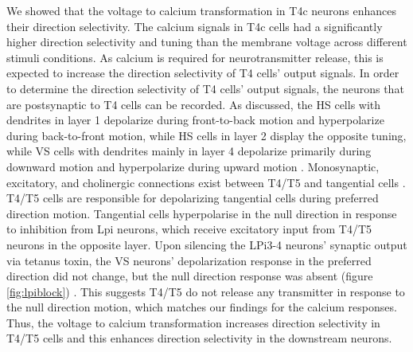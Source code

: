 We showed that the voltage to calcium transformation in T4c neurons enhances their direction selectivity. The calcium signals in T4c cells had a significantly higher direction selectivity and tuning than the membrane voltage across different stimuli conditions. As calcium is required for neurotransmitter release, this is expected to increase the direction selectivity of T4 cells' output signals. In order to determine the direction selectivity of T4 cells' output signals, the neurons that are postsynaptic to T4 cells can be recorded. As discussed, the HS cells with dendrites in layer 1 depolarize during front-to-back motion and hyperpolarize during back-to-front motion, while HS cells in layer 2 display the opposite tuning, while VS cells with dendrites mainly in layer 4 depolarize primarily during downward motion and hyperpolarize during upward motion \parencite{Schnell2010, Hopp2014, Scott2002}. Monosynaptic, excitatory, and cholinergic connections exist between T4/T5 and tangential cells \parencite{Mauss2014}. T4/T5 cells are responsible for depolarizing tangential cells during preferred direction motion. Tangential cells hyperpolarise in the null direction in response to inhibition from Lpi neurons, which receive excitatory input from T4/T5 neurons in the opposite layer. Upon silencing the LPi3-4 neurons’ synaptic output via tetanus toxin, the VS neurons' depolarization response in the preferred direction did not change, but the null direction response was absent (figure \ref{fig:lpiblock}) \parencite{Mauss2015}. This suggests T4/T5 do not release any transmitter in response to the null direction motion, which matches our findings for the calcium responses. Thus, the voltage to calcium transformation increases direction selectivity in T4/T5 cells and this enhances direction selectivity in the downstream neurons.

